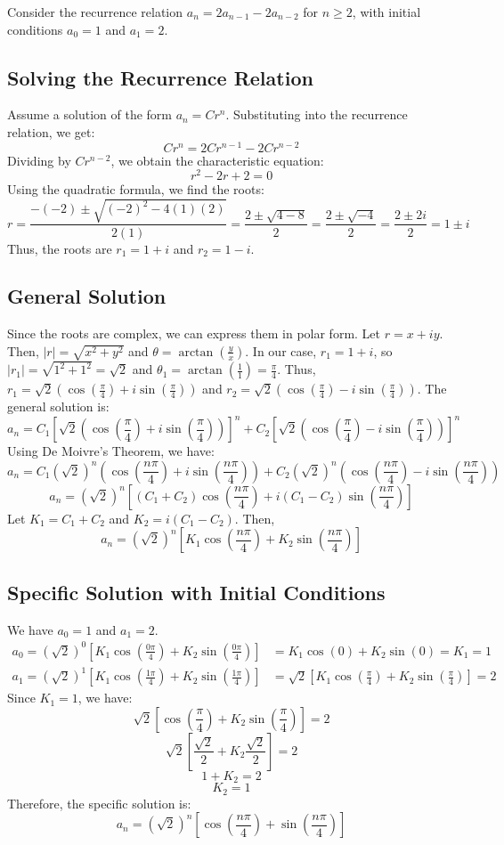 \documentclass{report}
\begin{document}
Consider the recurrence relation $a_n = 2a_{n-1} - 2a_{n-2}$ for $n \geq 2$, with initial conditions $a_0 = 1$ and $a_1 = 2$.

\subsection{Solving the Recurrence Relation}

Assume a solution of the form $a_n = Cr^n$. Substituting into the recurrence relation, we get:
$$Cr^n = 2Cr^{n-1} - 2Cr^{n-2}$$
Dividing by $Cr^{n-2}$, we obtain the characteristic equation:
$$r^2 - 2r + 2 = 0$$
Using the quadratic formula, we find the roots:
$$r = \frac{-(-2) \pm \sqrt{(-2)^2 - 4(1)(2)}}{2(1)} = \frac{2 \pm \sqrt{4 - 8}}{2} = \frac{2 \pm \sqrt{-4}}{2} = \frac{2 \pm 2i}{2} = 1 \pm i$$
Thus, the roots are $r_1 = 1 + i$ and $r_2 = 1 - i$.

\subsection{General Solution}

Since the roots are complex, we can express them in polar form. Let $r = x + iy$. Then, $|r| = \sqrt{x^2 + y^2}$ and $\theta = \arctan(\frac{y}{x})$.
In our case, $r_1 = 1 + i$, so $|r_1| = \sqrt{1^2 + 1^2} = \sqrt{2}$ and $\theta_1 = \arctan(\frac{1}{1}) = \frac{\pi}{4}$.
Thus, $r_1 = \sqrt{2}(\cos(\frac{\pi}{4}) + i\sin(\frac{\pi}{4}))$ and $r_2 = \sqrt{2}(\cos(\frac{\pi}{4}) - i\sin(\frac{\pi}{4}))$.
The general solution is:
$$a_n = C_1[\sqrt{2}(\cos(\frac{\pi}{4}) + i\sin(\frac{\pi}{4}))]^n + C_2[\sqrt{2}(\cos(\frac{\pi}{4}) - i\sin(\frac{\pi}{4}))]^n$$
Using De Moivre's Theorem, we have:
$$a_n = C_1 (\sqrt{2})^n (\cos(\frac{n\pi}{4}) + i\sin(\frac{n\pi}{4})) + C_2 (\sqrt{2})^n (\cos(\frac{n\pi}{4}) - i\sin(\frac{n\pi}{4}))$$
$$a_n = (\sqrt{2})^n [(C_1 + C_2)\cos(\frac{n\pi}{4}) + i(C_1 - C_2)\sin(\frac{n\pi}{4})]$$
Let $K_1 = C_1 + C_2$ and $K_2 = i(C_1 - C_2)$. Then,
$$a_n = (\sqrt{2})^n [K_1\cos(\frac{n\pi}{4}) + K_2\sin(\frac{n\pi}{4})]$$

\subsection{Specific Solution with Initial Conditions}

We have $a_0 = 1$ and $a_1 = 2$.
\begin{align*}
	a_0 = (\sqrt{2})^0 [K_1\cos(\frac{0\pi}{4}) + K_2\sin(\frac{0\pi}{4})] & = K_1\cos(0) + K_2\sin(0) = K_1 = 1                              \\
	a_1 = (\sqrt{2})^1 [K_1\cos(\frac{1\pi}{4}) + K_2\sin(\frac{1\pi}{4})] & = \sqrt{2} [K_1\cos(\frac{\pi}{4}) + K_2\sin(\frac{\pi}{4})] = 2
\end{align*}
Since $K_1 = 1$, we have:
$$\sqrt{2} [\cos(\frac{\pi}{4}) + K_2\sin(\frac{\pi}{4})] = 2$$
$$\sqrt{2} [\frac{\sqrt{2}}{2} + K_2\frac{\sqrt{2}}{2}] = 2$$
$$1 + K_2 = 2$$
$$K_2 = 1$$
Therefore, the specific solution is:
$$a_n = (\sqrt{2})^n [\cos(\frac{n\pi}{4}) + \sin(\frac{n\pi}{4})]$$
\end{document}

